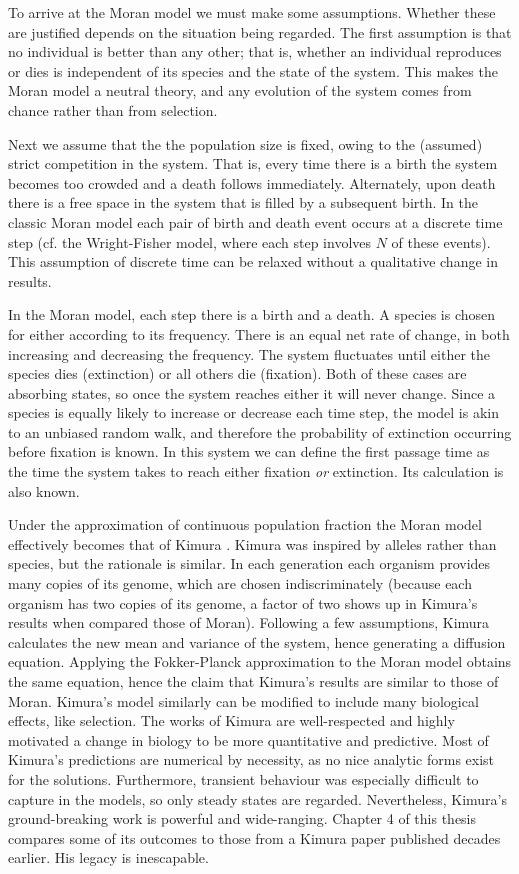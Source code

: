 To arrive at the Moran model we must make some assumptions. 
Whether these are justified depends on the situation being regarded. 
The first assumption is that no individual is better than any other; that is, whether an individual reproduces or dies is independent of its species and the state of the system. 
This makes the Moran model a neutral theory, and any evolution of the system comes from chance rather than from selection. 

Next we assume that the the population size is fixed, owing to the (assumed) strict competition in the system. 
That is, every time there is a birth the system becomes too crowded and a death follows immediately. Alternately, upon death there is a free space in the system that is filled by a subsequent birth. 
In the classic Moran model each pair of birth and death event occurs at a discrete time step (cf. the Wright-Fisher model, where each step involves $N$ of these events). 
This assumption of discrete time can be relaxed without a qualitative change in results. 

In the Moran model, each step there is a birth and a death. 
A species is chosen for either according to its frequency. 
There is an equal net rate of change, in both increasing and decreasing the frequency. 
The system fluctuates until either the species dies (extinction) or all others die (fixation). 
Both of these cases are absorbing states, so once the system reaches either it will never change. 
Since a species is equally likely to increase or decrease each time step, the model is akin to an unbiased random walk, and therefore the probability of extinction occurring before fixation is known. 
In this system we can define the first passage time as the time the system takes to reach either fixation \emph{or} extinction. 
Its calculation is also known. 

Under the approximation of continuous population fraction the Moran model effectively becomes that of Kimura \cite{Kimura1983}. 
Kimura was inspired by alleles rather than species, but the rationale is similar. 
In each generation each organism provides many copies of its genome, which are chosen indiscriminately (because each organism has two copies of its genome, a factor of two shows up in Kimura's results when compared those of Moran). 
Following a few assumptions, Kimura calculates the new mean and variance of the system, hence generating a diffusion equation. 
Applying the Fokker-Planck approximation to the Moran model obtains the same equation, hence the claim that Kimura's results are similar to those of Moran. 
Kimura's model similarly can be modified to include many biological effects, like selection. 
The works of Kimura are well-respected and highly motivated a change in biology to be more quantitative and predictive. 
Most of Kimura's predictions are numerical by necessity, as no nice analytic forms exist for the solutions. 
Furthermore, transient behaviour was especially difficult to capture in the models, so only steady states are regarded. 
Nevertheless, Kimura's ground-breaking work is powerful and wide-ranging. 
Chapter 4 of this thesis compares some of its outcomes to those from a Kimura paper published decades earlier. 
His legacy is inescapable. 

